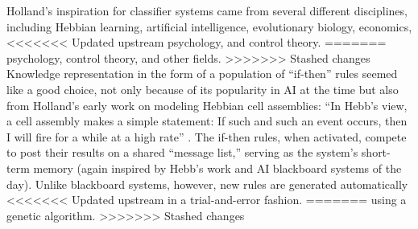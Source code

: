 \documentclass{sig-alternate}
\begin{document}






Holland's inspiration for classifier systems came from several
different disciplines, including Hebbian
learning, artificial intelligence, evolutionary biology, economics,
<<<<<<< Updated upstream
psychology, and control theory.
=======
psychology, control theory, and other fields.
>>>>>>> Stashed changes
Knowledge representation in the form of a
population of ``if-then'' rules seemed like a good choice, not only
because of its popularity in AI at the time but also from Holland's
early work on modeling Hebbian cell assemblies: ``In Hebb's view, a
cell assembly makes a simple statement: If such and such an event
occurs, then I will fire for a while at a high
rate'' \cite{Waldrop1993}. 
The if-then rules, when activated, compete to post their results on a
shared ``message list,'' serving as the system's short-term memory
(again inspired by Hebb's work and AI blackboard systems of the day).
Unlike blackboard systems, however, new rules are generated automatically
<<<<<<< Updated upstream
in a trial-and-error fashion.
=======
using a genetic algorithm.  
>>>>>>> Stashed changes
\end{document}
